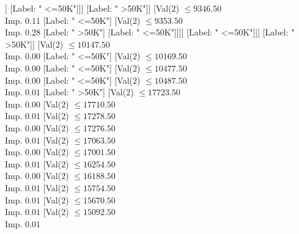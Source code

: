 \documentclass[margin=10pt]{standalone}
\begin{document}
\begin{forest}
																							[Val($2$) $ \leq 9258.50$ \\ Imp. $0.07$
																								[Label: " <=50K"]
																								[Val($2$) $ \leq 9271.50$ \\ Imp. $0.31$
																									[Val($2$) $ \leq 9266.50$ \\ Imp. $0.25$
																										[Label: " <=50K"]
																										[Label: " >50K"]]
																									[Label: " <=50K"]]]
																							[Label: " >50K"]]
																						[Val($2$) $ \leq 9346.50$ \\ Imp. $0.11$
																							[Label: " <=50K"]
																							[Val($2$) $ \leq 9353.50$ \\ Imp. $0.28$
																								[Label: " >50K"]
																								[Label: " <=50K"]]]]
																					[Label: " <=50K"]]]
																			[Label: " >50K"]]
																		[Val($2$) $ \leq 10147.50$ \\ Imp. $0.00$
																			[Label: " <=50K"]
																			[Val($2$) $ \leq 10169.50$ \\ Imp. $0.00$
																				[Label: " <=50K"]
																				[Val($2$) $ \leq 10477.50$ \\ Imp. $0.00$
																					[Label: " <=50K"]
																					[Val($2$) $ \leq 10487.50$ \\ Imp. $0.01$
																						[Label: " >50K"]
																						[Val($2$) $ \leq 17723.50$ \\ Imp. $0.00$
																							[Val($2$) $ \leq 17710.50$ \\ Imp. $0.01$
																								[Val($2$) $ \leq 17278.50$ \\ Imp. $0.00$
																									[Val($2$) $ \leq 17276.50$ \\ Imp. $0.01$
																										[Val($2$) $ \leq 17063.50$ \\ Imp. $0.00$
																											[Val($2$) $ \leq 17001.50$ \\ Imp. $0.01$
																												[Val($2$) $ \leq 16254.50$ \\ Imp. $0.00$
																													[Val($2$) $ \leq 16188.50$ \\ Imp. $0.01$
																														[Val($2$) $ \leq 15754.50$ \\ Imp. $0.01$
																															[Val($2$) $ \leq 15670.50$ \\ Imp. $0.01$
																																[Val($2$) $ \leq 15092.50$ \\ Imp. $0.01$

\end{forest}
\end{document}
